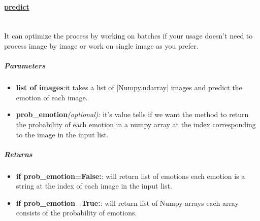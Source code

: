 \begin{comment}
\subparagraph{Usage:}
\begin{changemargin}{0.5cm}{0cm}
\begin{itemize}
\item import the module:
\begin{lstlisting}[language=Python]
from model.emotions_model import *\end{lstlisting}

\item create new object:
\begin{lstlisting}[language=Python]
model = EmotionsModel(
		verbose=False,
		create_new=False,
		use_hog=None,
		use_cnn=None,
		use_lm=None,
		emotions=None
)\end{lstlisting}

\end{itemize}
\end{changemargin}
\end{comment}

\newpage
\paragraph{\underline{predict}} \mbox{} \\
It can optimize the process by working on batches if your usage doesn't need to process image by image or work on single image as you prefer.

\subparagraph{Parameters}
\begin{changemargin}{0.5cm}{0cm}
\begin{itemize}
	\item \textbf{list of images}:it takes a list of [Numpy.ndarray] images and predict the emotion of each image.
	\item \textbf{prob\_emotion}\textit{(optional)}: it's value tells if we want the method to return the probability of each emotion in a numpy array at the index corresponding to the image in the input list. 
\end{itemize}
\end{changemargin}

\subparagraph{Returns}
\begin{changemargin}{0.5cm}{0cm}
\begin{itemize}[nolistsep]
	\item \textbf{if prob\_emotion=False:}:\newline
	will return list of emotions each emotion is a string at the index of each image in the input list.
	\item \textbf{if prob\_emotion=True:}:\newline
	will return list of Numpy arrays each array consists of the probability of emotions.
\end{itemize}
\end{changemargin}


